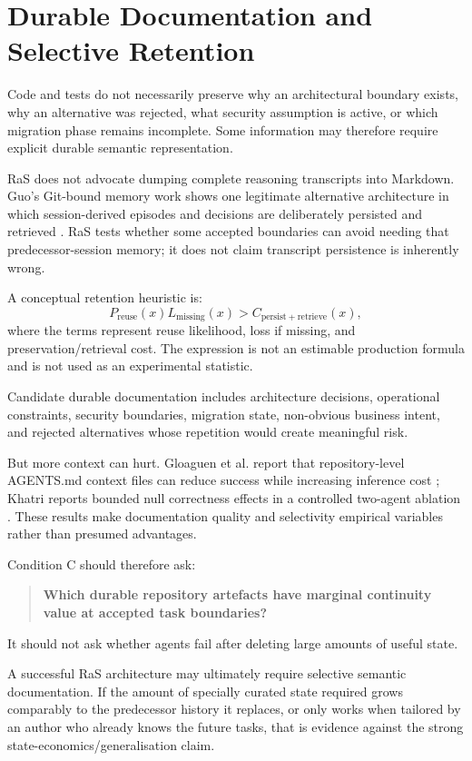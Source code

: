 \section{Durable Documentation and Selective Retention}
\label{sec:durable-docs}

Code and tests do not necessarily preserve why an architectural boundary exists, why an alternative was rejected, what security assumption is active, or which migration phase remains incomplete. Some information may therefore require explicit durable semantic representation.

RaS does not advocate dumping complete reasoning transcripts into Markdown. Guo's Git-bound memory work shows one legitimate alternative architecture in which session-derived episodes and decisions are deliberately persisted and retrieved \citep{guo2026gitmemory}. RaS tests whether some accepted boundaries can avoid needing that predecessor-session memory; it does not claim transcript persistence is inherently wrong.

A conceptual retention heuristic is:
\begin{equation}
P_{\mathrm{reuse}}(x)L_{\mathrm{missing}}(x)
>
C_{\mathrm{persist+retrieve}}(x),
\label{eq:retention}
\end{equation}
where the terms represent reuse likelihood, loss if missing, and preservation/retrieval cost. The expression is not an estimable production formula and is not used as an experimental statistic.

Candidate durable documentation includes architecture decisions, operational constraints, security boundaries, migration state, non-obvious business intent, and rejected alternatives whose repetition would create meaningful risk.

But more context can hurt. Gloaguen et al. report that repository-level AGENTS.md context files can reduce success while increasing inference cost \citep{gloaguen2026agentsmd}; Khatri reports bounded null correctness effects in a controlled two-agent ablation \citep{khatri2026contextfiles}. These results make documentation quality and selectivity empirical variables rather than presumed advantages.

Condition C should therefore ask:
\begin{quote}
\textbf{Which durable repository artefacts have marginal continuity value at accepted task boundaries?}
\end{quote}
It should not ask whether agents fail after deleting large amounts of useful state.

A successful RaS architecture may ultimately require selective semantic documentation. If the amount of specially curated state required grows comparably to the predecessor history it replaces, or only works when tailored by an author who already knows the future tasks, that is evidence against the strong state-economics/generalisation claim.
